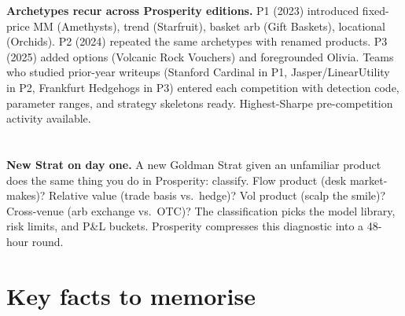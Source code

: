 \begin{historybox}
\textbf{Archetypes recur across Prosperity editions.}  P1 (2023)
introduced fixed-price MM (Amethysts), trend (Starfruit), basket arb
(Gift Baskets), locational (Orchids).  P2 (2024) repeated the same
archetypes with renamed products.  P3 (2025) added options (Volcanic
Rock Vouchers) and foregrounded Olivia.  Teams who studied
prior-year writeups (Stanford Cardinal in P1, Jasper/LinearUtility
in P2, Frankfurt Hedgehogs in P3) entered each competition with
detection code, parameter ranges, and strategy skeletons ready.
Highest-Sharpe pre-competition activity available.
\end{historybox}

\section*{}
\vspace{-2em}
\begin{gsbox}
\textbf{New Strat on day one.}  A new Goldman Strat given an
unfamiliar product does the same thing you do in Prosperity:
classify.  Flow product (desk market-makes)?  Relative value (trade
basis vs.\ hedge)?  Vol product (scalp the smile)?  Cross-venue
(arb exchange vs.\ OTC)?  The classification picks the model
library, risk limits, and P\&L buckets.  Prosperity compresses this
diagnostic into a 48-hour round.
\end{gsbox}

\section{Key facts to memorise}
\label{sec:algo_rounds_keyfacts}

